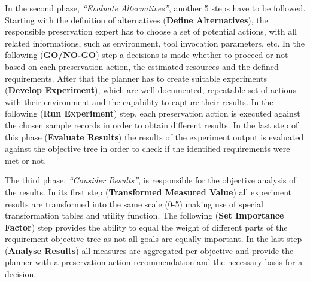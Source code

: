 In the second phase, \textit{``Evaluate Alternatives''}, another 5 steps have to be followed. Starting with the definition of alternatives (\textbf{Define Alternatives}), the responsible preservation expert has to choose a set of potential actions, with all related informations, such as environment, tool invocation parameters, etc. In the following (\textbf{GO/NO-GO}) step a decisions is made whether to proceed or not based on each preservation action, the estimated resources and the defined requirements. After that the planner has to create suitable experiments (\textbf{Develop Experiment}), which are well-documented, repeatable set of actions with their environment and the capability to capture their results. In the following (\textbf{Run Experiment}) step, each preservation action is executed against the chosen sample records in order to obtain different results. In the last step of this phase (\textbf{Evaluate Results}) the results of the experiment output is evaluated against the objective tree in order to check if the identified requirements were met or not.

The third phase, \textit{``Consider Results''}, is responsible for the objective analysis of the results. In its first step (\textbf{Transformed Measured Value}) all experiment results are transformed into the same scale (0-5) making use of special transformation tables and utility function. The following (\textbf{Set Importance Factor}) step provides the ability to equal the weight of different parts of the requirement objective tree as not all goals are equally important. In the last step (\textbf{Analyse Results}) all measures are aggregated per objective and provide the planner with a preservation action recommendation and the necessary basis for a decision.

